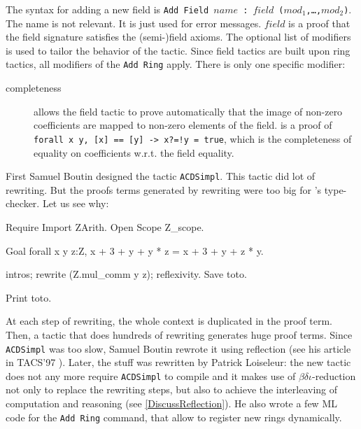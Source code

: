 The syntax for adding a new field is {\tt Add Field $name$ : $field$
($mod_1$,\dots,$mod_2$)}.  The name is not relevant. It is just used
for error messages. $field$ is a proof that the field signature
satisfies the (semi-)field axioms. The optional list of modifiers is
used to tailor the behavior of the tactic. Since field tactics are
built upon ring tactics, all modifiers of the {\tt Add Ring}
apply. There is only one specific modifier:
\begin{description}
\item[completeness \term] allows the field tactic to prove
  automatically that the image of non-zero coefficients are mapped to
  non-zero elements of the field. \term is a proof of {\tt forall x y,
    [x] == [y] -> x?=!y = true}, which is the completeness of equality
  on coefficients w.r.t. the field equality.
\end{description}


First Samuel Boutin designed the tactic \texttt{ACDSimpl}.
This tactic did lot of rewriting. But the proofs
terms generated by rewriting were too big for \Coq's type-checker.
Let us see why:

\begin{coq_eval}
Require Import ZArith.
Open Scope Z_scope.
\end{coq_eval}
\begin{coq_example}
Goal forall x y z:Z, x + 3 + y + y * z = x + 3 + y + z * y.
\end{coq_example}
\begin{coq_example*}
intros; rewrite (Z.mul_comm y z); reflexivity.
Save toto.
\end{coq_example*}
\begin{coq_example}
Print toto.
\end{coq_example}

At each step of rewriting, the whole context is duplicated in the proof
term. Then, a tactic that does hundreds of rewriting generates huge proof
terms. Since \texttt{ACDSimpl} was too slow, Samuel Boutin rewrote it
using reflection (see his article in TACS'97 \cite{Bou97}). Later, the
stuff was rewritten by Patrick
Loiseleur: the new tactic does not any more require \texttt{ACDSimpl}
to compile and it makes use of $\beta\delta\iota$-reduction
not only to replace the rewriting steps, but also to achieve the
interleaving of computation and
reasoning (see \ref{DiscussReflection}). He also wrote a
few ML code for the \texttt{Add Ring} command, that allow to register
new rings dynamically.

